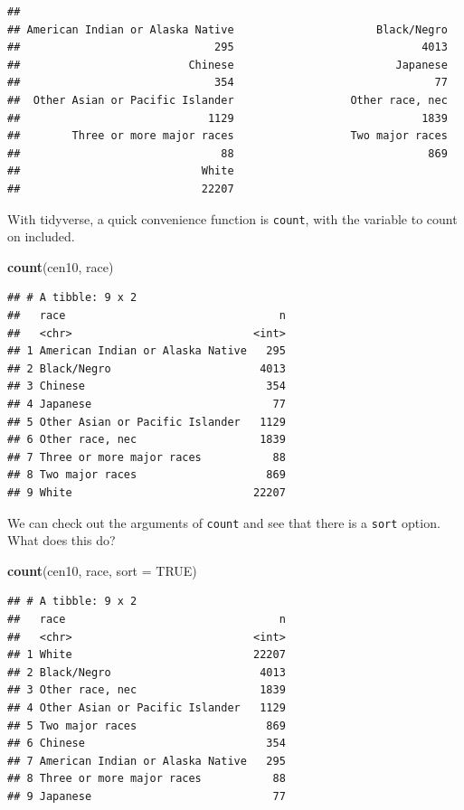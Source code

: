 \documentclass[
]{book}
\newenvironment{Shaded}{\begin{snugshade}}{\end{snugshade}}
\newcommand{\DataTypeTok}[1]{\textcolor[rgb]{0.13,0.29,0.53}{#1}}
\newcommand{\KeywordTok}[1]{\textcolor[rgb]{0.13,0.29,0.53}{\textbf{#1}}}
\newcommand{\NormalTok}[1]{#1}
\newcommand{\OtherTok}[1]{\textcolor[rgb]{0.56,0.35,0.01}{#1}}
\theoremstyle{definition}
\theoremstyle{definition}
\theoremstyle{definition}
\theoremstyle{remark}
\begin{document}
\begin{verbatim}
## 
## American Indian or Alaska Native                      Black/Negro 
##                              295                             4013 
##                          Chinese                         Japanese 
##                              354                               77 
##  Other Asian or Pacific Islander                  Other race, nec 
##                             1129                             1839 
##        Three or more major races                  Two major races 
##                               88                              869 
##                            White 
##                            22207
\end{verbatim}

With tidyverse, a quick convenience function is \texttt{count}, with the variable to count on included.

\begin{Shaded}
\begin{Highlighting}[]
\KeywordTok{count}\NormalTok{(cen10, race)}
\end{Highlighting}
\end{Shaded}

\begin{verbatim}
## # A tibble: 9 x 2
##   race                                 n
##   <chr>                            <int>
## 1 American Indian or Alaska Native   295
## 2 Black/Negro                       4013
## 3 Chinese                            354
## 4 Japanese                            77
## 5 Other Asian or Pacific Islander   1129
## 6 Other race, nec                   1839
## 7 Three or more major races           88
## 8 Two major races                    869
## 9 White                            22207
\end{verbatim}

We can check out the arguments of \texttt{count} and see that there is a \texttt{sort} option. What does this do?

\begin{Shaded}
\begin{Highlighting}[]
\KeywordTok{count}\NormalTok{(cen10, race, }\DataTypeTok{sort =} \OtherTok{TRUE}\NormalTok{)}
\end{Highlighting}
\end{Shaded}

\begin{verbatim}
## # A tibble: 9 x 2
##   race                                 n
##   <chr>                            <int>
## 1 White                            22207
## 2 Black/Negro                       4013
## 3 Other race, nec                   1839
## 4 Other Asian or Pacific Islander   1129
## 5 Two major races                    869
## 6 Chinese                            354
## 7 American Indian or Alaska Native   295
## 8 Three or more major races           88
## 9 Japanese                            77
\end{verbatim}
\end{document}
